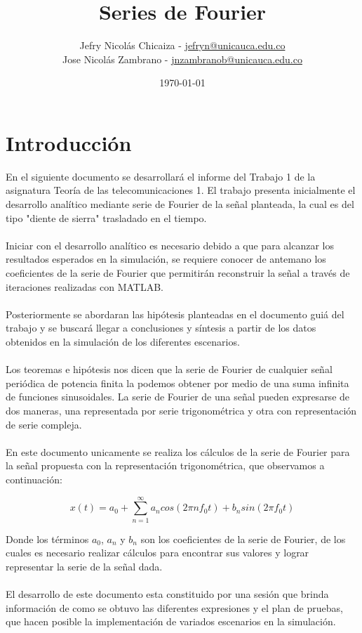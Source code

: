 \documentclass[7pt]{article}
\date{\today}.
\title{\textbf{Series de Fourier}}
\author{
    Jefry Nicolás Chicaiza - \url{jefryn@unicauca.edu.co}\\
    Jose Nicolás Zambrano - \url{jnzambranob@unicauca.edu.co}
}
\date{}
\begin{document}
\maketitle
\thispagestyle{fancy}
\section*{Introducción}
    En el siguiente documento se desarrollará el informe del Trabajo 1 de la asignatura 
    Teoría de las telecomunicaciones 1. El trabajo presenta inicialmente el desarrollo 
    analítico mediante serie de Fourier de la señal planteada, la cual es del tipo 
    "diente de sierra"  trasladado en el tiempo.\\
    \\
    Iniciar con el desarrollo analítico es necesario debido a que para alcanzar los 
    resultados esperados en la simulación, se requiere conocer de antemano los coeficientes 
    de la serie de Fourier que permitirán reconstruir la señal a través de iteraciones 
    realizadas con MATLAB.\\
    \\
    Posteriormente se abordaran las hipótesis planteadas en el documento guiá del trabajo 
    y se buscará llegar a conclusiones y síntesis a partir de los datos obtenidos en la 
    simulación de los diferentes escenarios.\\
    \\
    Los teoremas e hipótesis nos dicen que la serie de Fourier de cualquier señal periódica de potencia 
    finita la podemos obtener por medio de una suma infinita de funciones sinusoidales. La serie de 
    Fourier de una señal pueden expresarse de dos maneras, una representada por serie trigonométrica y 
    otra con representación de serie compleja.\\ 
    \\
    En este documento unicamente se realiza los cálculos de la serie de Fourier para la señal propuesta 
    con la representación trigonométrica, que observamos a continuación:

    \begin{equation}
        x(t)=a_{0}+\sum_{n=1}^{\infty} a_{n}cos(2\pi nf_{0}t)+b_{n}sin(2\pi f_{0}t)
        \label{equation1}
    \end{equation}
    
    Donde los términos $a_{0}$, $a_{n}$ y $b_{n}$ son los coeficientes de la serie de Fourier, de los cuales
    es necesario realizar cálculos para encontrar sus valores y lograr representar la serie de la señal dada.\\
    \\
    El desarrollo de este documento esta constituido por una sesión que brinda información 
    de como se obtuvo las diferentes expresiones y el plan de pruebas, que hacen posible la 
    implementación de variados escenarios en la simulación.
   
\end{document}
